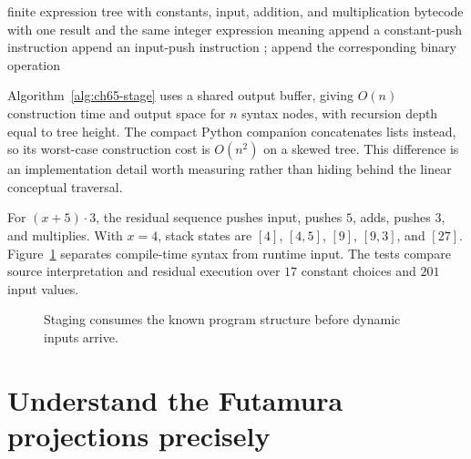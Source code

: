 \begin{algorithm}[htbp]
\caption{Residualize known expression syntax into stack bytecode.}
\label{alg:ch65-stage}
\begin{pseudocode}
\Require finite expression tree with constants, input, addition, and multiplication
\Ensure bytecode with one result and the same integer expression meaning
    \State append a constant-push instruction
    \State append an input-push instruction
  \Else
    \State {}; 
    \State append the corresponding binary operation
  \EndIf
\EndFunction
\end{pseudocode}
\end{algorithm}

Algorithm~\ref{alg:ch65-stage} uses a shared output buffer, giving $O(n)$ construction time and output space for $n$ syntax nodes, with recursion depth equal to tree height.
The compact Python companion concatenates lists instead, so its worst-case construction cost is $O(n^2)$ on a skewed tree.
This difference is an implementation detail worth measuring rather than hiding behind the linear conceptual traversal.

For $(x+5)\cdot3$, the residual sequence pushes input, pushes $5$, adds, pushes $3$, and multiplies.
With $x=4$, stack states are $[4]$, $[4,5]$, $[9]$, $[9,3]$, and $[27]$.
Figure~\ref{fig:ch65-staging} separates compile-time syntax from runtime input.
The tests compare source interpretation and residual execution over $17$ constant choices and $201$ input values.

\begin{figure}[htbp]
\centering
{}
\caption{Staging consumes the known program structure before dynamic inputs arrive.}
\label{fig:ch65-staging}
\end{figure}

\section{Understand the Futamura projections precisely}
\label{sec:ch65-projections}

